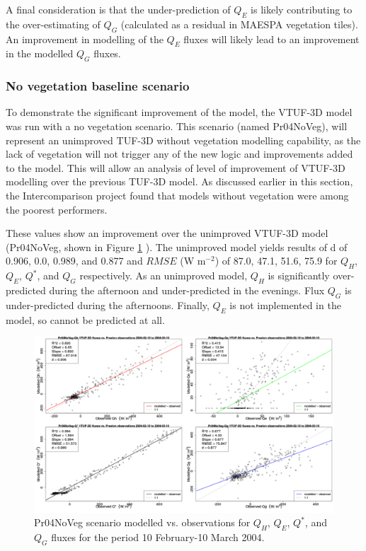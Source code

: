 \documentclass[final,3p,times,authoryear]{elsarticle}
\begin{document}
A final consideration is that the under-prediction of $Q_{E}$ is likely contributing to the over-estimating of $Q_{G}$ (calculated as a residual in MAESPA vegetation tiles). An improvement in modelling of the $Q_{E}$ fluxes will likely lead to an improvement in the modelled $Q_{G}$ fluxes. 

\subsubsection{No vegetation baseline scenario}\label{sec:baselinenoveg}

To demonstrate the significant improvement of the model, the VTUF-3D model was run with a no vegetation scenario. This scenario (named Pr04NoVeg), will represent an unimproved TUF-3D without vegetation modelling capability, as the lack of vegetation will not trigger any of the new logic and improvements added to the model. This will allow an analysis of level of improvement of VTUF-3D modelling over the previous TUF-3D model. As discussed earlier in this section, the Intercomparison project found that models without vegetation were among the poorest performers.
 
These values show an improvement over the unimproved VTUF-3D model (Pr04NoVeg, shown in Figure \ref{fig:Prestonnovegerror} ). The unimproved model yields results of d of 0.906, 0.0, 0.989, and 0.877 and $RMSE$ (W m$^{-2}$) of 87.0, 47.1, 51.6, 75.9 for $Q_{H}$, $Q_{E}$, $Q^{*}$, and $Q_{G}$ respectively. As an unimproved model, $Q_{H}$ is significantly over-predicted during the afternoon and under-predicted in the evenings. Flux $Q_{G}$ is under-predicted during the afternoons. Finally, $Q_{E}$ is not implemented in the model, so cannot be predicted at all.




\begin{figure}[!htbp]
\includegraphics[trim = 0mm 0mm 0mm 0mm, clip, scale=0.30]{images/Pr04NoVeg-ErrorPlots.png}
\caption{Pr04NoVeg scenario modelled vs. observations for $Q_{H}$, $Q_{E}$, $Q^{*}$, and $Q_{G}$ fluxes for the period 10 February-10 March 2004. \label{fig:Prestonnovegerror}}    
\end{figure}
\end{document}

